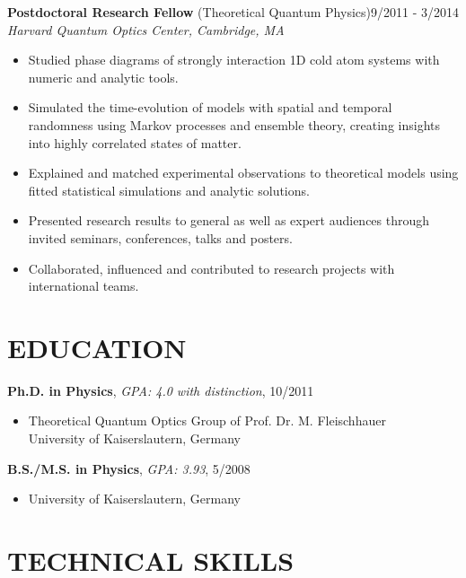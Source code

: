 \documentclass[10pt,centered]{./res} %
\begin{document}
\begin{resume}
{\bf Postdoctoral Research Fellow} (Theoretical Quantum Physics)\hfill 9/2011 - 3/2014 \\
{\it Harvard Quantum Optics Center, Cambridge, MA}
\begin{itemize}
  \item Studied phase diagrams of strongly interaction 1D cold atom systems with numeric and analytic tools.
  \item Simulated the time-evolution of models with spatial and temporal randomness using Markov processes and ensemble theory, creating insights into highly correlated states of matter.
  \item Explained and matched experimental observations to theoretical models using fitted statistical simulations and analytic solutions.
  \item Presented research results to general as well as expert audiences through invited seminars, conferences, talks and posters.
  \item Collaborated, influenced and contributed to research projects with international teams.
\end{itemize}

\section{\color{ResumeBlue}EDUCATION}

{\bf Ph.D. in Physics}, {\it GPA: 4.0 with distinction}, 10/2011
\begin{itemize}
 \item[] Theoretical Quantum Optics Group of Prof. Dr. M. Fleischhauer\\ University of Kaiserslautern, Germany
\end{itemize}
\vspace*{-0.2cm}
{\bf B.S./M.S. in Physics}, {\it GPA: 3.93}, 5/2008
\begin{itemize}
 \item[] University of Kaiserslautern, Germany
\end{itemize}

\section{\color{ResumeBlue}TECHNICAL SKILLS}


\end{resume}
\end{document}

